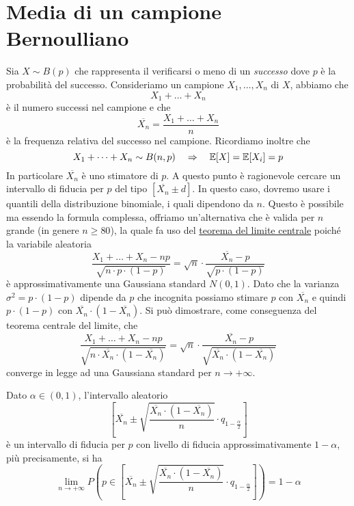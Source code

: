 \section{Media di un campione Bernoulliano}
Sia $X \sim B(p)$ che rappresenta il verificarsi o meno di un \emph{successo} dove $p$ è la
probabilità del successo. Consideriamo un campione $X_1, \dots, X_n$ \iid di $X$, abbiamo che
\[ X_1 + \dots + X_n \]
è il numero successi nel campione e che
\[ \overline{X_n} = \frac{X_1 + \dots + X_n}{n} \]
è la frequenza relativa del successo nel campione. Ricordiamo inoltre che
\[ X_1 + \dots + X_n \sim B(n,p) \quad \Rightarrow \quad \mathbb{E}[X] = \mathbb{E}[X_i] = p \]
In particolare $\overline{X_n}$ è uno stimatore di $p$. A questo punto è ragionevole cercare un
intervallo di fiducia per $p$ del tipo $[\overline{X_n} \pm d]$. In questo caso, dovremo usare i
quantili della distribuzione binomiale, i quali dipendono da $n$. Questo è possibile ma essendo
la formula complessa, offriamo un'alternativa che è valida per $n$ grande (in genere $n \geq 80$),
la quale fa uso del \hyperref[th: tlc]{teorema del limite centrale} poiché la variabile aleatoria
\[
	\frac{X_1 + \dots + X_n - np}{\sqrt{n \cdot p \cdot (1-p)}} =
	\sqrt{n} \cdot \frac{\overline{X_n} - p}{\sqrt{p \cdot (1-p)}}
\]
è approssimativamente una Gaussiana standard $N(0,1)$. Dato che la varianza
$\sigma^2 = p \cdot (1-p)$ dipende da $p$ che incognita possiamo stimare $p$ con $\overline{X_n}$
e quindi $p \cdot (1-p)$ con $\overline{X_n} \cdot (1 - \overline{X_n})$. Si può dimostrare, come
conseguenza del teorema centrale del limite, che
\[
	\frac{X_1 + \dots + X_n - np}{\sqrt{n \cdot \overline{X_n} \cdot (1 - \overline{X_n})}} =
	\sqrt{n} \cdot \frac{\overline{X_n} - p}{\sqrt{\overline{X_n} \cdot (1 - \overline{X_n})}}
\]
converge in legge ad una Gaussiana standard per $n \to +\infty$.

\begin{proposition}
	Dato $\alpha \in (0,1)$, l'intervallo aleatorio
	\[
		\left[
			\overline{X_n} \pm \sqrt{\frac{\overline{X_n} \cdot (1 - \overline{X_n})}{n}}
			\cdot q_{1 - \frac{\alpha}{2}}
			\right]
	\]
	è un intervallo di fiducia per $p$ con livello di fiducia approssimativamente $1-\alpha$, più
	precisamente, si ha
	\[
		\lim_{n \to +\infty} P \left( p \in \left[ \overline{X_n} \pm
			\sqrt{\frac{\overline{X_n} \cdot (1 - \overline{X_n})}{n}} \cdot
			q_{1 - \frac{\alpha}{2}} \right] \right) = 1 - \alpha
	\]
\end{proposition}

